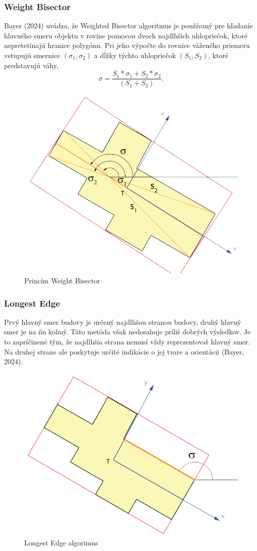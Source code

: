 \documentclass[12pt]{article}
\begin{document}
\subsubsection*{Weight Bisector}
Bayer (2024) uvádza, že Weighted Bisector algoritmus je používaný pre hľadaníe hlavného smeru objektu v rovine pomocou dvoch najdlhších uhlopriečok, ktoré nepretetínajú hranice polygónu. Pri jeho výpočte do rovnice váženého priemeru vstupujú smernice $(\sigma_{1}, \sigma_{2})$    a dĺžky týchto uhlopriečok $(S_1, S_2)$, ktoré predstavujú váhy, 
$$\sigma = \frac{S_1*\sigma_1 + S_2*\sigma_2}{(S_1+S_2)}.$$
\begin{figure}[h]
    \centering
    \includegraphics[width=0.7\linewidth]{latex/image/wb.png}
    \caption{Princím Weight Bisector}
    \label{fig:enter-label}
\end{figure}
\subsubsection*{Longest Edge}
Prvý hlavný smer budovy je určený najdlhšou stranou budovy, druhý hlavný smer je na ňu kolmý. Táto metóda však nedosahuje príliš dobrých výsledkov. Je to zapríčinené tým, že najdlhšia strana nemusí vždy reprezentovať hlavný smer. Na druhej strane ale poskytuje určité indikácie o jej tvare a orientácii (Bayer, 2024). 
\begin{figure}[t]
    \centering
    \includegraphics[width=0.7\linewidth]{latex/image/le.png}
    \caption{Longest Edge algorimus}
    \label{fig:enter-label}
\end{figure}
\newpage
\end{document}
